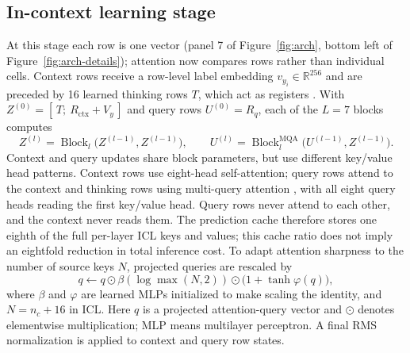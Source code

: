 \documentclass[11pt]{article}
\newcommand{\R}{\mathbb{R}}
\newcommand{\Block}{\operatorname{Block}}
\begin{document}
\subsection{In-context learning stage}
At this stage each row is one vector (panel 7 of Figure~\ref{fig:arch}, bottom left of
Figure~\ref{fig:arch-details}); attention now compares rows rather than individual cells.
Context rows receive a row-level label embedding $v_{y_i}\in\R^{256}$ and are preceded by 16 learned
thinking rows $T$, which act as registers \cite{darcet2024}. With $Z^{(0)}=[\,T;\ R_{\mathrm{ctx}}+V_{y}\,]$
and query rows $U^{(0)}=R_{q}$, each of the $L=7$ blocks computes
\begin{equation}
Z^{(l)}=\Block_l\big(Z^{(l-1)},Z^{(l-1)}\big),\qquad
U^{(l)}=\Block_l^{\mathrm{MQA}}\big(U^{(l-1)},Z^{(l-1)}\big).
\end{equation}
Context and query updates share block parameters, but use different key/value head patterns.
Context rows use eight-head self-attention; query rows attend to the context and thinking rows
using multi-query attention \cite{shazeer2019}, with all eight query heads reading the first
key/value head. Query rows never attend to each other, and the context never reads them. The
prediction cache therefore stores one eighth of the full per-layer ICL keys and values; this
cache ratio does not imply an eightfold reduction in total inference cost. To adapt attention
sharpness to the number of source keys $N$, projected queries are rescaled by
\begin{equation}
q\leftarrow q\odot\beta(\log\max(N,2))\odot\big(1+\tanh\varphi(q)\big),
\label{eq:query-scaling}
\end{equation}
where $\beta$ and $\varphi$ are learned MLPs initialized to make scaling the identity, and
$N=n_c+16$ in ICL. Here $q$ is a projected attention-query vector and $\odot$ denotes elementwise
multiplication; MLP means multilayer perceptron. A final RMS normalization is applied to context and query row states.
\end{document}
